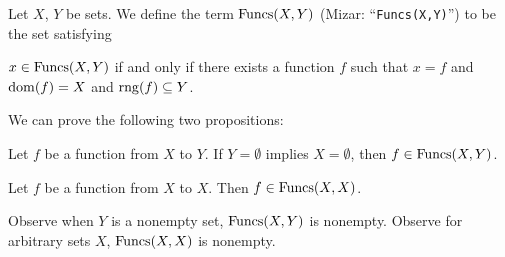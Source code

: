 \documentclass{article}
\begin{document}
\begin{definition}
Let $X$, $Y$ be sets.
We define the term $\operatorname{Funcs}(X,Y)$ (Mizar: ``\verb#Funcs(X,Y)#'') to be
the set satisfying
\begin{defn}
\item $x\in\operatorname{Funcs}(X,Y)$ if and only if there exists a function $f$ such
  that $x=f$ and $\operatorname{dom}(f)=X$ and $\operatorname{rng}(f)\subseteq Y$.
\end{defn}
\end{definition}

We can prove the following two propositions:
\begin{thm}
\item\label{funct2:8} Let $f$ be a function from $X$ to $Y$.
  If $Y=\emptyset$ implies $X=\emptyset$, then $f\in\operatorname{Funcs}(X,Y)$.
\item\label{funct2:9} Let $f$ be a function from $X$ to $X$.
  Then $f\in\operatorname{Funcs}(X,X)$.
\end{thm}


Observe when $Y$ is a nonempty set, $\operatorname{Funcs}(X,Y)$ is nonempty.
Observe for arbitrary sets $X$, $\operatorname{Funcs}(X,X)$ is nonempty.
\end{document}
